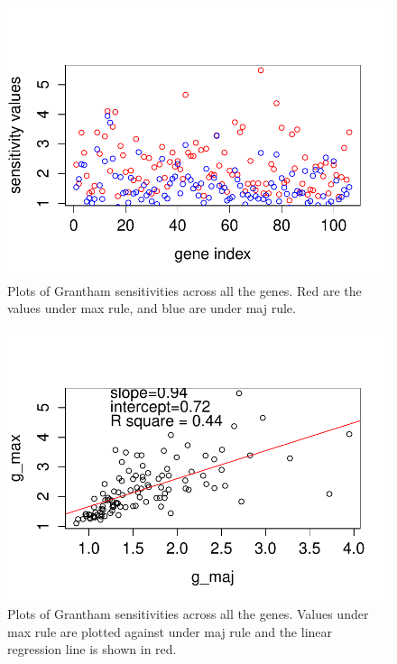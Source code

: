 \begin{figure}[h]
\centering
\includegraphics[width=\textwidth]{gvalue_max_maj.pdf}
\caption{Plots of Grantham sensitivities across all the genes. Red are the values under max rule, and blue are under maj rule.}
\label{fig:gvalue}
\end{figure}

\begin{figure}[h]
\centering
\includegraphics[width=\textwidth]{gvalue.pdf}
\caption{Plots of Grantham sensitivities across all the genes. Values under max rule are plotted against under maj rule and the linear regression line is shown in red.}
\label{fig:gvaluecorr}
\end{figure}


